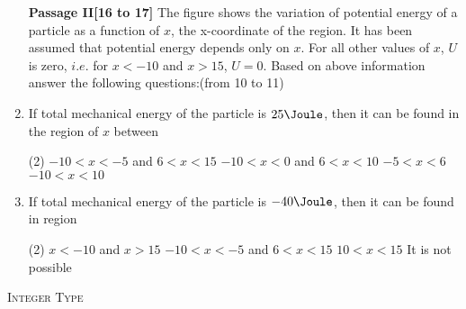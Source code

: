 \documentclass{article}
\renewcommand{\ans}{\quad}
\begin{document}
\begin{enumerate}
    {\textbf{Passage II[16 to 17]}}
    The figure shows the variation of potential energy of a particle as a function of $x$, the x-coordinate of the region. It has been assumed that potential energy depends only on $x$. For all other values of $x$, $U$ is zero, $i.e.$ for $x < -10$ and $x > 15$, $U = 0$. Based on above information answer the following questions:(from 10 to 11)
    \begin{center}
    \end{center}
    \item If total mechanical energy of the particle is $25 \Joule$, then it can be found in the region of $x$ between
    \begin{tasks}(2)
        \task $-10<x<-5$ and $6<x<15$ \ans
        \task $-10<x<0$ and $6<x<10$
        \task $-5<x<6$
        \task $-10<x<10$
    \end{tasks}

    \item If total mechanical energy of the particle is $-40 \Joule$, then it can be found in region
    \begin{tasks}(2)
        \task $x<-10$ and $x>15$
        \task $-10<x<-5$ and $6<x<15$
        \task $10<x<15$
        \task It is not possible \ans
    \end{tasks}


    
    

    

\end{enumerate}

\begin{center}
    \textsc{Integer Type}
\end{center}
\end{document}
